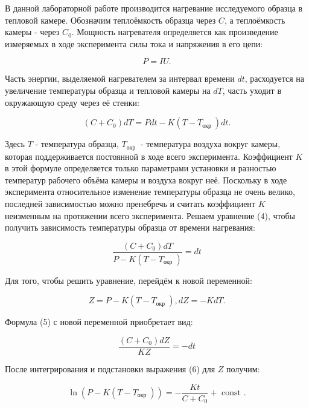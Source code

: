 \documentclass[a4paper]{article}
\begin{document}
В данной лабораторной работе производится нагревание исследуемого образца в тепловой камере. Обозначим теплоёмкость образца через $C$, а теплоёмкость камеры - через $C_{0}$. Мощность нагревателя определяется как произведение измеряемых в ходе эксперимента силы тока и напряжения в его цепи:


\begin{equation*}
P=I U . \tag{3}
\end{equation*}


Часть энергии, выделяемой нагревателем за интервал времени $d t$, расходуется на увеличение температуры образца и тепловой камеры на $d T$, часть уходит в окружающую среду через её стенки:


\begin{equation*}
\left(C+C_{0}\right) d T=P d t-K\left(T-T_{\text {окр }}\right) d t . \tag{4}
\end{equation*}


Здесь $T$ - температура образца, $T_{\text {окр }}$ - температура воздуха вокруг камеры, которая поддерживается постоянной в ходе всего эксперимента. Коэффициент $K$ в этой формуле определяется только параметрами установки и разностью температур рабочего объёма камеры и воздуха вокруг неё. Поскольку в ходе эксперимента относительное изменение температуры образца не очень велико, последней зависимостью можно пренебречь и считать коэффициент $K$ неизменным на протяжении всего эксперимента. Решаем уравнение (4), чтобы получить зависимость температуры образца от времени нагревания:


\begin{equation*}
\frac{\left(C+C_{0}\right) d T}{P-K\left(T-T_{\text {окр }}\right)}=d t \tag{5}
\end{equation*}


Для того, чтобы решить уравнение, перейдём к новой переменной:


\begin{equation*}
Z=P-K\left(T-T_{\text {окр }}\right), d Z=-K d T . \tag{6}
\end{equation*}


Формула (5) с новой переменной приобретает вид:


\begin{equation*}
\frac{\left(C+C_{0}\right) d Z}{K Z}=-d t \tag{7}
\end{equation*}


После интегрирования и подстановки выражения (6) для $Z$ получим:


\begin{equation*}
\ln \left(P-K\left(T-T_{\text {окр }}\right)\right)=-\frac{K t}{C+C_{0}}+\text { const } . \tag{8}
\end{equation*}
\end{document}
